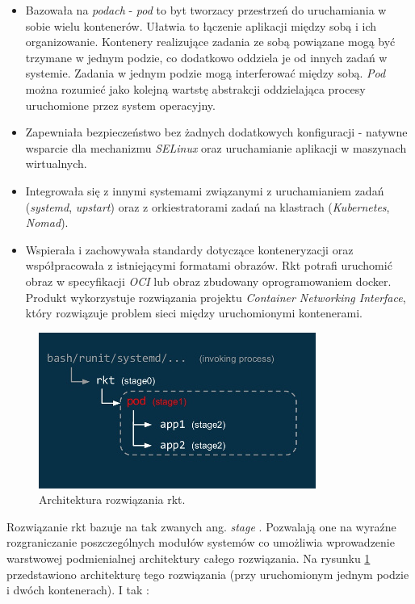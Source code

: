 \documentclass[10pt,a4paper,titlepage,twoside]{report}
\begin{document}
\begin{itemize}
\item Bazowała na \textit{podach} - \textit{pod} to byt tworzacy przestrzeń do uruchamiania w sobie wielu kontenerów. Ułatwia to łączenie aplikacji między sobą i ich organizowanie. Kontenery realizujące zadania ze sobą powiązane mogą być trzymane w jednym podzie, co dodatkowo oddziela je od innych zadań w systemie. Zadania w jednym podzie mogą interferować między sobą. \textit{Pod} można rozumieć jako kolejną wartstę abstrakcji oddzielająca procesy uruchomione przez system operacyjny.
\item Zapewniała bezpieczeństwo bez żadnych dodatkowych konfiguracji - natywne wsparcie dla mechanizmu \textit{SELinux} oraz uruchamianie aplikacji w maszynach wirtualnych.
\item Integrowała się z innymi systemami związanymi z uruchamianiem zadań (\textit{systemd}, \textit{upstart}) oraz z orkiestratorami zadań na klastrach (\textit{Kubernetes}, \textit{Nomad}).
\item Wspierała i zachowywała standardy dotyczące konteneryzacji oraz współpracowała z istniejącymi formatami obrazów. Rkt potrafi uruchomić obraz w specyfikacji \textit{OCI} lub obraz zbudowany oprogramowaniem docker. Produkt wykorzystuje rozwiązania projektu \textit{Container Networking Interface}, który rozwiązuje problem sieci między uruchomionymi kontenerami.
\end{itemize}

\begin{figure}[!h]
	\centering
	\includegraphics[scale=1]{pics/rkt-architecure.jpg}
	\caption{Architektura rozwiązania rkt.}
	\label{rkt_arch}
\end{figure}

Rozwiązanie rkt bazuje na tak zwanych ang. \textit{stage} \cite{ad30}. Pozwalają one na wyraźne rozgraniczanie poszczególnych modułów systemów co umożliwia wprowadzenie warstwowej podmienialnej architektury całego rozwiązania. Na rysunku \ref{rkt_arch} przedstawiono architekturę tego rozwiązania (przy uruchomionym jednym podzie i dwóch kontenerach). I tak \cite{ad30}:
\end{document}
